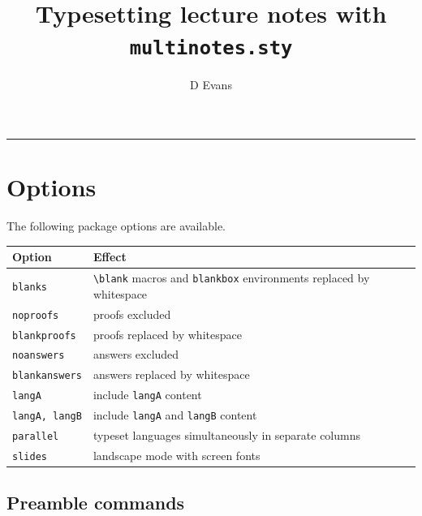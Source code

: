 \documentclass{article}
\title{Typesetting lecture notes with {\tt multinotes.sty}}
\author{D Evans}
\theoremstyle{break}
\begin{document}
\maketitle
\bigskip\hrule\bigskip
\tableofcontents

\newpage

\section{Options}

The following package options are available.
\begin{table}[htb]
\renewcommand{\arraystretch}{1.3}
\addtolength{\tabcolsep}{2ex}
\begin{tabular}{lll}
\hline\hline
Option				& Effect \\
\hline\hline
{\tt blanks}		& \verb+\blank+ macros and \verb+blankbox+ environments replaced by whitespace \\
{\tt noproofs}		& proofs excluded \\
{\tt blankproofs}	& proofs replaced by whitespace \\
{\tt noanswers}		& answers excluded \\
{\tt blankanswers}	& answers replaced by whitespace \\
\hline
{\tt langA}			& include {\tt langA} content \\
{\tt langA, langB}	& include {\tt langA} and {\tt langB} content \\
\hline
{\tt parallel}		& typeset languages simultaneously in separate columns \\
{\tt slides}		& landscape mode with screen fonts \\
\hline\hline
\end{tabular}
\end{table}

\subsection{Preamble commands}
\end{document}
